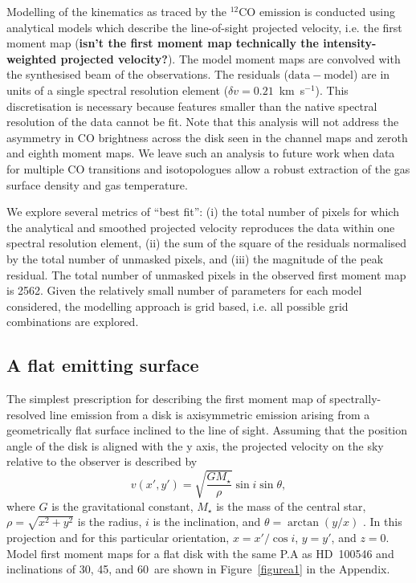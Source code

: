 \documentclass[onecolumn]{aastex6}
\newcommand{\kms}{km~s$^{-1}$}
\begin{document}
Modelling of the kinematics as traced by the $^{12}$CO emission is conducted 
using analytical models which describe the line-of-sight projected velocity, 
i.e. the first moment map (\textbf{isn't the first moment map technically the
intensity-weighted projected velocity?}).  
The model moment maps are convolved with the synthesised beam of the observations.  
The residuals ($\mathrm{data} - \mathrm{model}$) are in units of a single spectral 
resolution element ($\delta v = 0.21$~\kms).
This discretisation is necessary because features smaller than the native spectral 
resolution of the data cannot be fit. 
Note that this analysis will not address the asymmetry in CO brightness across 
the disk seen in the channel maps and zeroth and eighth moment maps.  
We leave such an analysis to future work when data for multiple 
CO transitions and isotopologues allow a robust extraction of 
the gas surface density and gas temperature.  

We explore several metrics of ``best fit'':
(i) the total number of pixels for which the analytical and smoothed 
projected velocity reproduces the data within one spectral resolution element,
(ii) the sum of the square of the residuals normalised by the total number of unmasked pixels, and 
(iii) the magnitude of the peak residual. 
The total number of unmasked pixels in the observed first moment map is 2562.  
Given the relatively small number of parameters for each model considered, 
the modelling approach is grid based, i.e. all possible grid combinations are explored.  

\subsection{A flat emitting surface}

The simplest prescription for describing the first moment map of spectrally-resolved 
line emission from a disk 
is axisymmetric emission arising from a geometrically flat surface inclined to the line of sight.  
Assuming that the position angle of the disk is aligned with the 
y axis, the projected velocity on the sky relative to the observer is described by
\begin{equation}
v(x',y') = \sqrt{\frac{G M_\star}{\rho}} \sin i \sin \theta, 
\label{velocity}
\end{equation}
where $G$ is the gravitational constant, $M_\star$ is the mass of the central 
star, $\rho=\sqrt{x^2+y^2}$ is the radius, $i$ is the inclination, and 
$\theta = \arctan(y/x)$ \citep[e.g.,][]{rosenfeld13}.  
In this projection and for this particular orientation, 
$x = x'/\cos i$, $y = y'$, and $z = 0$. 
Model first moment maps for a flat disk with the same P.A as HD~100546 and
inclinations of 30\degree, 45\degree, and  60\degree\ are shown in
Figure~\ref{figurea1} in the Appendix.  
\end{document}
